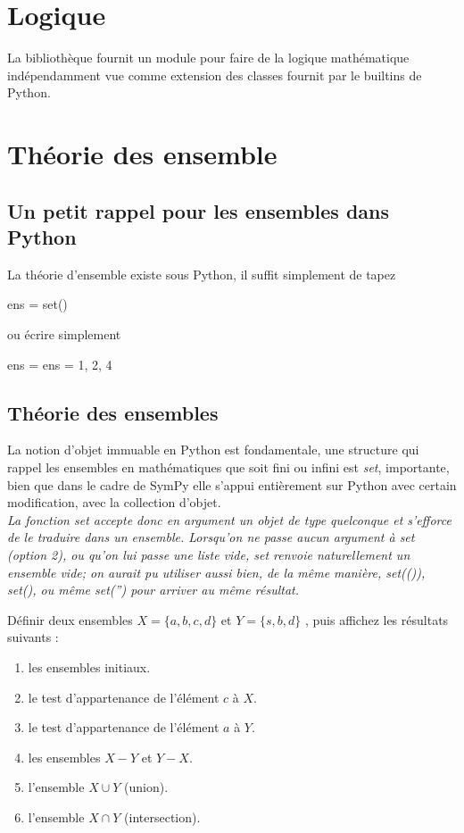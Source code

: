 \chapter{Logique}
La bibliothèque fournit un module pour faire de la logique mathématique indépendamment vue comme extension
des classes fournit par le builtins de Python.
\chapter{Théorie des ensemble}
\section{Un petit rappel pour les ensembles dans Python}
La théorie d'ensemble existe sous Python, il suffit simplement de tapez 
\begin{python}
ens = set()
\end{python}
ou écrire simplement 
\begin{python}
 ens = ens = {1, 2, 4}
\end{python}
\section{Théorie des ensembles}
La notion d'objet immuable en Python est fondamentale,  une structure qui rappel les ensembles en mathématiques que soit fini ou infini est \textit{set}, importante, bien que dans le cadre de SymPy elle s'appui entièrement sur Python avec certain modification, avec la collection d'objet.
\\

\textit{La fonction set accepte donc en argument un objet de type quelconque et s'efforce de le traduire dans un ensemble. Lorsqu'on ne passe aucun argument à set (option 2), ou qu'on lui passe une liste vide, set renvoie naturellement un ensemble vide; on aurait pu utiliser aussi bien, de la même manière, set(()), set({}), ou même set('') pour arriver au même résultat.}

\begin{exercise}
		Définir deux ensembles $X = \lbrace a, b, c, d\rbrace$ et  $Y = \lbrace s, b, d\rbrace$ , puis 			affichez les résultats suivants :
 		\begin{enumerate}
  			 \item les ensembles initiaux.
  			 \item le test d’appartenance de l’élément $c$ à $X$.
  			 \item le test d’appartenance de l’élément $a$ à $Y$.
  			 \item les ensembles $X - Y$ et $Y - X$.
  			 \item l’ensemble $X \cup Y$ (union).
  			 \item l'ensemble $X \cap Y$ (intersection).
	 \end{enumerate}
\end{exercise}

